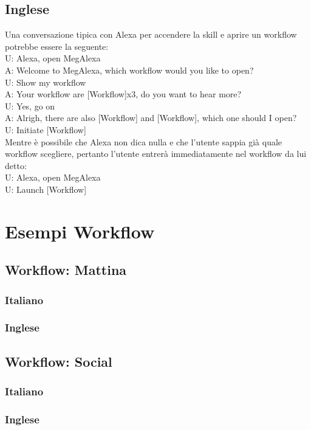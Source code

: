 \subsection{Inglese}
Una conversazione tipica con Alexa per accendere la skill e aprire un workflow potrebbe essere la seguente:\\

U: Alexa, open MegAlexa \\
A: Welcome to MegAlexa, which workflow would you like to open?\\
U: Show my workflow\\
A: Your workflow are [Workflow]x3, do you want to hear more?\\
U: Yes, go on\\
A: Alrigh, there are also [Workflow] and [Workflow], which one should I open?\\
U: Initiate [Workflow] \\

Mentre è possibile che Alexa non dica nulla e che l'utente sappia già quale workflow scegliere, pertanto l'utente entrerà immediatamente nel workflow da lui detto: \\
U: Alexa, open MegAlexa\\
U: Launch [Workflow]\\

\section{Esempi Workflow}
\subsection{Workflow: Mattina}
\subsubsection{Italiano}
\subsubsection{Inglese}


\subsection{Workflow: Social}
\subsubsection{Italiano}
\subsubsection{Inglese}